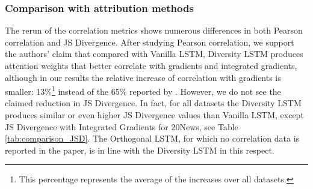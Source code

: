 \subsubsection{Comparison with attribution methods}
\label{sec:comparison_attribution}
The rerun of the correlation metrics shows numerous differences in both Pearson correlation and JS Divergence.
After studying Pearson correlation, we support the authors' claim that compared with Vanilla LSTM, Diversity LSTM produces attention weights that better correlate with gradients and integrated gradients, although in our results the relative increase of correlation with gradients is smaller: 13\%\footnote{\scriptsize This percentage represents the average of the increases over all datasets.} instead of the 65\% reported by \citet{mohankumar_towards_2020}.
However, we do not see the claimed reduction in JS Divergence. In fact, for all datasets the Diversity LSTM produces similar or even higher JS Divergence values than Vanilla LSTM, except JS Divergence with Integrated Gradients for 20News, see Table \ref{tab:comparison_JSD}. The Orthogonal LSTM, for which no correlation data is reported in the paper, is in line with the Diversity LSTM in this respect.

